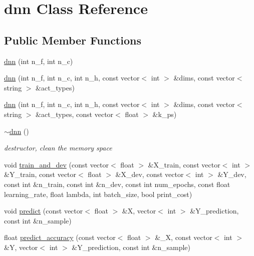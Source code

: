 \hypertarget{classdnn}{}\section{dnn Class Reference}
\label{classdnn}
\subsection*{Public Member Functions}
\begin{DoxyCompactItemize}
\item 
\hyperlink{classdnn_ab6d436cbc35d10258bd8d3e314cb36b8}{dnn} (int n\+\_\+f, int n\+\_\+c)
\item 
\hyperlink{classdnn_aae6e714fc63cc1b73b40510e5a3401c7}{dnn} (int n\+\_\+f, int n\+\_\+c, int n\+\_\+h, const vector$<$ int $>$ \&dims, const vector$<$ string $>$ \&act\+\_\+types)
\item 
\hyperlink{classdnn_a657974689367069e38e600c594a461f0}{dnn} (int n\+\_\+f, int n\+\_\+c, int n\+\_\+h, const vector$<$ int $>$ \&dims, const vector$<$ string $>$ \&act\+\_\+types, const vector$<$ float $>$ \&k\+\_\+ps)
\item 
\mbox{\label{classdnn_a3384dfd89ac2e10f6554e05a53b288ad}} 
\hyperlink{classdnn_a3384dfd89ac2e10f6554e05a53b288ad}{$\sim$dnn} ()
\begin{DoxyCompactList}\small\item\em destructor, clean the memory space \end{DoxyCompactList}\item 
void \hyperlink{classdnn_a0e498a3b9d592bd9d217bd0c8f4fa94a}{train\+\_\+and\+\_\+dev} (const vector$<$ float $>$ \&X\+\_\+train, const vector$<$ int $>$ \&Y\+\_\+train, const vector$<$ float $>$ \&X\+\_\+dev, const vector$<$ int $>$ \&Y\+\_\+dev, const int \&n\+\_\+train, const int \&n\+\_\+dev, const int num\+\_\+epochs, const float learning\+\_\+rate, float lambda, int batch\+\_\+size, bool print\+\_\+cost)
\item 
void \hyperlink{classdnn_a9809de12b4182b61b98e652b0e61856c}{predict} (const vector$<$ float $>$ \&X, vector$<$ int $>$ \&Y\+\_\+prediction, const int \&n\+\_\+sample)
\item 
float \hyperlink{classdnn_a7f12d5a496ec38e1b4def98908e32236}{predict\+\_\+accuracy} (const vector$<$ float $>$ \&\+\_\+X, const vector$<$ int $>$ \&Y, vector$<$ int $>$ \&Y\+\_\+prediction, const int \&n\+\_\+sample)
\end{DoxyCompactItemize}


